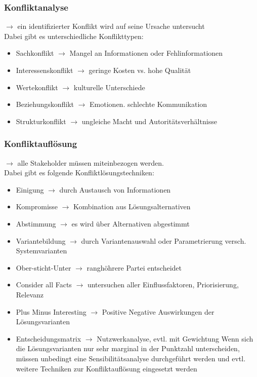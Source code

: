 \documentclass{report}
\theoremstyle{definition}
\theoremstyle{example}
\begin{document}
\subsubsection{Konfliktanalyse}
$\rightarrow$ ein identifizierter Konflikt wird auf seine Ursache untersucht\\
Dabei gibt es unterschiedliche Konflikttypen:
\begin{itemize}
   \item Sachkonflikt $\rightarrow$ Mangel an Informationen oder Fehlinformationen
   \item Interessenskonflikt $\rightarrow$ geringe Kosten vs. hohe Qualität
   \item Wertekonflikt $\rightarrow$ kulturelle Unterschiede
   \item Beziehungskonflikt $\rightarrow$ Emotionen. schlechte Kommunikation
   \item Strukturkonflikt $\rightarrow$ ungleiche Macht und Autoritätsverhältnisse
\end{itemize}

\subsubsection{Konfliktauflösung}
$\rightarrow$ alle Stakeholder müssen miteinbezogen werden.\\

Dabei gibt es folgende Konfliktlösungstechniken:
\begin{itemize}
   \item Einigung $\rightarrow$ durch Austausch von Informationen 
   \item Kompromisse $\rightarrow$ Kombination aus Lösungsalternativen
   \item Abstimmung $\rightarrow$ es wird über Alternativen abgestimmt
   \item Variantebildung $\rightarrow$ durch Variantenauswahl oder Parametrierung versch. Systemvarianten
   \item Ober-sticht-Unter $\rightarrow$ ranghöhrere Partei entscheidet
   \item Consider all Facts $\rightarrow$ untersuchen aller Einflussfaktoren, Priorisierung, Relevanz
   \item Plus Minus Interesting $\rightarrow$ Positive Negative Auswirkungen der Lösungsvarianten
   \item Entscheidungsmatrix $\rightarrow$ Nutzwerkanalyse, evtl. mit Gewichtung
   \subitem Wenn sich die Lösungsvarianten nur sehr marginal in der Punktzahl unterscheiden, müssen unbedingt eine Sensibilitätsanalyse durchgeführt werden und evtl. weitere Techniken zur Konfliktauflösung eingesetzt werden 
\end{itemize}
\end{document}
